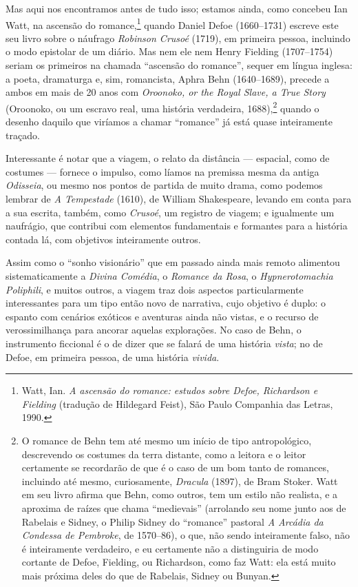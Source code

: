 Mas aqui nos encontramos antes de tudo isso; estamos ainda, como
concebeu Ian Watt, na ascensão do romance,\footnote{Watt, Ian. \emph{A
  ascensão do romance: estudos sobre Defoe, Richardson e Fielding}
  (tradução de Hildegard Feist), São Paulo Companhia das Letras, 1990.}
quando Daniel Defoe (1660--1731) escreve este seu livro sobre o náufrago
\emph{Robinson Crusoé} (1719), em primeira pessoa, incluindo o modo
epistolar de um diário. Mas nem ele nem Henry Fielding (1707--1754)
seriam os primeiros na chamada ``ascensão do romance'', sequer em língua
inglesa: a poeta, dramaturga e, sim, romancista, Aphra Behn (1640--1689),
precede a ambos em mais de 20 anos com \emph{Oroonoko, or the Royal
Slave, a True Story} (Oroonoko, ou um escravo real, uma história
verdadeira, 1688),\footnote{O romance de Behn tem até mesmo um início de
  tipo antropológico, descrevendo os costumes da terra distante, como a
  leitora e o leitor certamente se recordarão de que é o caso de um bom
  tanto de romances, incluindo até mesmo, curiosamente, \emph{Dracula}
  (1897), de Bram Stoker. Watt em seu livro afirma que Behn, como
  outros, tem um estilo não realista, e a aproxima de raízes que chama
  ``medievais'' (arrolando seu nome junto aos de Rabelais e Sidney, o
  Philip Sidney do ``romance'' pastoral \emph{A Arcádia da Condessa de
  Pembroke}, de 1570--86), o que, não sendo inteiramente falso, não é
  inteiramente verdadeiro, e eu certamente não a distinguiria de modo
  cortante de Defoe, Fielding, ou Richardson, como faz Watt: ela está
  muito mais próxima deles do que de Rabelais, Sidney ou Bunyan.}
quando o desenho daquilo que viríamos a chamar ``romance'' já está quase
inteiramente traçado.

Interessante é notar que a viagem, o relato da distância --- espacial,
como de costumes --- fornece o impulso, como líamos na premissa mesma da
antiga \emph{Odisseia}, ou mesmo nos pontos de partida de muito drama,
como podemos lembrar de \emph{A Tempestade} (1610), de William
Shakespeare, levando em conta para a sua escrita, também, como
\emph{Crusoé}, um registro de viagem; e igualmente um naufrágio, que
contribui com elementos fundamentais e formantes para a história contada
lá, com objetivos inteiramente outros.


Assim como o ``sonho visionário'' que em passado ainda mais remoto
alimentou sistematicamente a \emph{Divina Comédia}, o \emph{Romance da
Rosa}, o \emph{Hypnerotomachia Poliphili}, e muitos outros, a viagem
traz dois aspectos particularmente interessantes para um tipo então novo
de narrativa, cujo objetivo é duplo: o espanto com cenários exóticos e
aventuras ainda não vistas, e o recurso de verossimilhança para ancorar
aquelas explorações. No caso de Behn, o instrumento ficcional é o de
dizer que se falará de uma história \emph{vista}; no de Defoe, em
primeira pessoa, de uma história \emph{vivida}.

